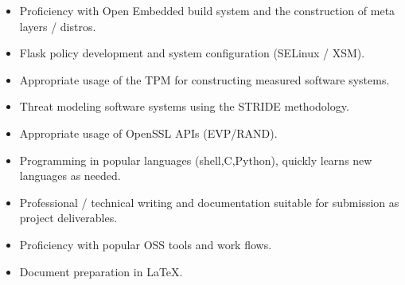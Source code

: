 \documentclass[letterpaper,11pt]{article}
\begin{document}
    \begin {itemize}
      \setlength {\itemsep}{1pt}
      \setlength {\parskip}{0pt}
      \setlength {\parsep}{0pt}
      \item Proficiency with Open Embedded build system and the construction of meta layers / distros.
      \item Flask policy development and system configuration (SELinux / XSM).
      \item Appropriate usage of the TPM for constructing measured software systems.
      \item Threat modeling software systems using the STRIDE methodology.
      \item Appropriate usage of OpenSSL APIs (EVP/RAND).
      \item Programming in popular languages (shell,C,Python), quickly learns new languages as needed.
      \item Professional / technical writing and documentation suitable for submission as project deliverables.
      \item Proficiency with popular OSS tools and work flows.
      \item Document preparation in \LaTeX.
    \end {itemize}
\end{document}
